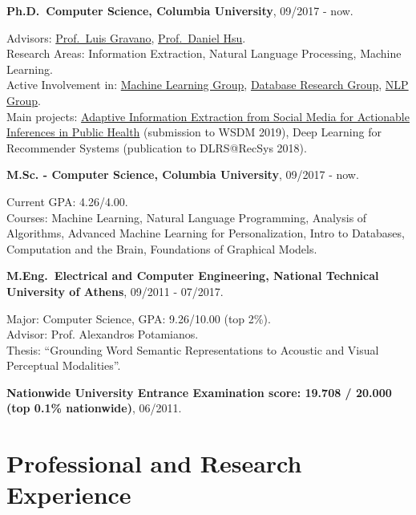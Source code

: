 \documentclass[letterpaper]{article}
\renewenvironment{itemize}{
  \begin{list}{}{
    \setlength{\leftmargin}{1.5em}
  }
}{
  \end{list}
}
\begin{document}
\begin{itemize}
  \item
    \textbf{Ph.D.~Computer Science, Columbia University}, 
     09/2017 - now.
     
    Advisors: \href{http://www.cs.columbia.edu/~gravano/}{Prof.~Luis Gravano}, \href{http://www.cs.columbia.edu/~djhsu/}{Prof.~Daniel Hsu}.
    \\
    Research Areas: Information Extraction, Natural Language Processing, Machine Learning.\\
    Active Involvement in: %
    \href{http://www.cs.columbia.edu/areas/machine/}{Machine Learning Group}, \href{https://cudbg.github.io/}{Database Research Group}, \href{http://www.cs.columbia.edu/nlp/index.cgi}{NLP Group}.\\
    Main projects: \href{http://publichealth.cs.columbia.edu/}{Adaptive Information Extraction from Social Media for Actionable Inferences in Public Health} (submission to WSDM 2019), Deep Learning for Recommender Systems (publication to DLRS@RecSys 2018). 

    \item 
        \textbf{M.Sc. - Computer Science, Columbia University}, 09/2017 - now.
        
    	Current GPA: 4.26/4.00.\\
        Courses: Machine Learning, Natural Language Programming, Analysis of Algorithms, Advanced Machine Learning for Personalization, Intro to Databases, Computation and the Brain, Foundations of Graphical Models. 
  \item
    \textbf{M.Eng.~Electrical and Computer Engineering, National Technical University of Athens},
    09/2011 - 07/2017.

Major: Computer Science, GPA: 9.26/10.00 (top 2\%).\\
 Advisor: Prof. Alexandros Potamianos.\\
Thesis: ``Grounding Word Semantic Representations to Acoustic and Visual Perceptual Modalities''.

\item \textbf{Nationwide University Entrance Examination score: 19.708 / 20.000 (top 0.1\% nationwide)},
06/2011.

\end{itemize}

\section*{Professional and Research Experience}
\end{document}
